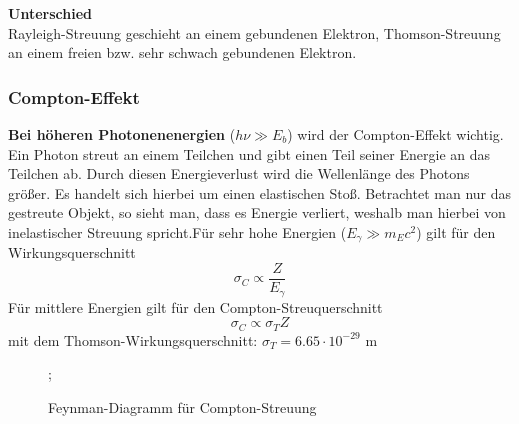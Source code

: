 \documentclass[Ex4_Zusammenfassung.tex]{subfiles}
\begin{document}
\textbf{Unterschied}  \\ \newline
Rayleigh-Streuung geschieht an einem gebundenen Elektron, Thomson-Streuung an einem freien bzw. sehr schwach gebundenen Elektron.

\subsubsection{Compton-Effekt}
\textbf{Bei höheren Photonenenergien} ($ h \nu \gg E_b$) wird der Compton-Effekt wichtig. Ein Photon streut an einem Teilchen und gibt einen Teil seiner Energie an das Teilchen ab. Durch diesen Energieverlust wird die Wellenlänge des Photons größer.\newline
Es handelt sich hierbei um einen elastischen Stoß. Betrachtet man nur das gestreute Objekt, so sieht man, dass es Energie verliert, weshalb man hierbei von inelastischer Streuung spricht.Für sehr hohe Energien ($E_{\gamma} \gg m_E c^2$) gilt für den Wirkungsquerschnitt
\begin{equation}
\sigma_{C} \propto \frac{Z}{E_{\gamma}}
\end{equation}
Für mittlere Energien gilt für den Compton-Streuquerschnitt
\begin{equation}
\sigma_{C} \propto \sigma_{T} Z 
\end{equation}
mit dem Thomson-Wirkungsquerschnitt: $\sigma_{T} = 6.65 \cdot 10^{-29} $ m 

\begin{figure}[H]
	\centering
					;
		\caption{Feynman-Diagramm für Compton-Streuung}
	\end{figure}
	
\end{document}
